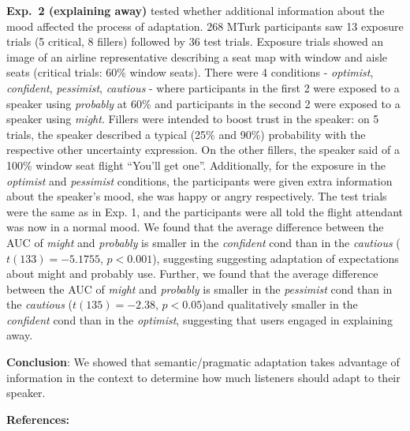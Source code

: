 \documentclass[11pt]{article}
\begin{document}
\noindent \textbf{Exp.~2 (explaining away)} tested whether additional information about the mood affected the process of adaptation. 268 MTurk participants saw 13 exposure trials (5 critical, 8 fillers) followed by 36 test trials. Exposure trials showed an image of an airline representative describing a seat map with window and aisle seats (critical trials: 60\% window seats). There were 4 conditions - \textit{optimist}, \textit{confident}, \textit{pessimist}, \textit{cautious} - where participants in the first 2 were exposed to a speaker using \textit{probably} at 60\% and participants in the second 2 were exposed to a speaker using \textit{might}. Fillers were intended to boost trust in the speaker: on 5 trials, the speaker described a typical (25\% and 90\%) probability with the respective other uncertainty expression. On the other fillers, the speaker said of a 100\% window seat flight “You’ll get one”. Additionally, for the exposure in the \textit{optimist} and \textit{pessimist} conditions, the participants were given extra information about the speaker's mood, she was happy or angry respectively. The test trials were the same as in Exp. 1, and the participants were all told the flight attendant was now in a normal mood. We found that the average difference between the AUC of \textit{might} and \textit{probably} is smaller in the \textit{confident} cond than in the \textit{cautious} ($t(133)=-5.1755$, $p < 0.001$), suggesting suggesting adaptation of expectations about might and probably use. Further, we found that the average difference between the AUC of \textit{might} and \textit{probably} is smaller in the \textit{pessimist} cond than in the \textit{cautious} ($t(135)=-2.38$, $p < 0.05$)and qualitatively smaller in the \textit{confident} cond than in the \textit{optimist}, suggesting that users engaged in explaining away.


\noindent \textbf{Conclusion}: We showed that semantic/pragmatic adaptation takes advantage of information in the context to determine how much listeners should adapt to their speaker. 


\noindent \textbf{References:} 
\end{document}
